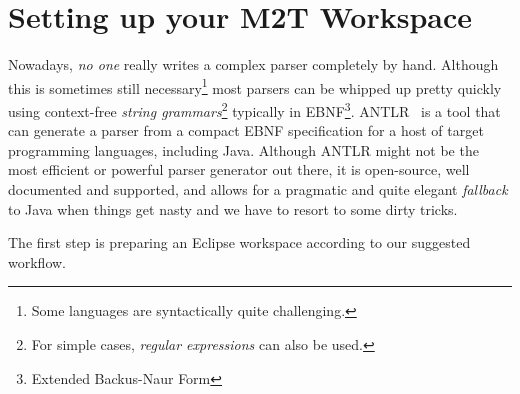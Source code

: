 \section{Setting up your M2T Workspace}

Nowadays, \emph{no one} really writes a complex parser completely by hand.
Although this is sometimes still necessary\footnote{Some languages are syntactically quite challenging.} most parsers can be whipped up pretty quickly using context-free \emph{string grammars}\footnote{For simple cases, \emph{regular expressions} can also be used.} typically in EBNF\footnote{Extended Backus-Naur Form}.
ANTLR~\cite{ANTLR} is a tool that can generate a parser from a compact EBNF specification for a host of target programming languages, including Java.
Although ANTLR might not be the most efficient or powerful parser generator out there, it is open-source, well documented and supported, and allows for a pragmatic and quite elegant \emph{fallback} to Java when things get nasty and we have to resort to some dirty tricks.

The first step is preparing an Eclipse workspace according to our suggested workflow.

